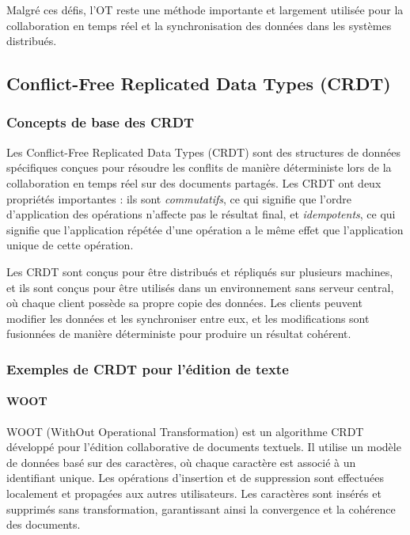 Malgré ces défis, l'OT reste une méthode importante et largement utilisée pour la collaboration en temps réel et la synchronisation des données dans les systèmes distribués.

\subsection{Conflict-Free Replicated Data Types (CRDT)}
\subsubsection{Concepts de base des CRDT}

Les Conflict-Free Replicated Data Types (CRDT) sont des structures de données spécifiques conçues pour résoudre les conflits de manière déterministe lors de la collaboration en temps réel sur des documents partagés\cite{crdt}. Les CRDT ont deux propriétés importantes : ils sont \textit{commutatifs}, ce qui signifie que l'ordre d'application des opérations n'affecte pas le résultat final, et \textit{idempotents}, ce qui signifie que l'application répétée d'une opération a le même effet que l'application unique de cette opération.

Les CRDT sont conçus pour être distribués et répliqués sur plusieurs machines, et ils sont conçus pour être utilisés dans un environnement sans serveur central, où chaque client possède sa propre copie des données. Les clients peuvent modifier les données et les synchroniser entre eux, et les modifications sont fusionnées de manière déterministe pour produire un résultat cohérent.

\subsubsection{Exemples de CRDT pour l'édition de texte}

\paragraph{WOOT}
WOOT (WithOut Operational Transformation) est un algorithme CRDT développé pour l'édition collaborative de documents textuels. Il utilise un modèle de données basé sur des caractères, où chaque caractère est associé à un identifiant unique. Les opérations d'insertion et de suppression sont effectuées localement et propagées aux autres utilisateurs. Les caractères sont insérés et supprimés sans transformation, garantissant ainsi la convergence et la cohérence des documents.

